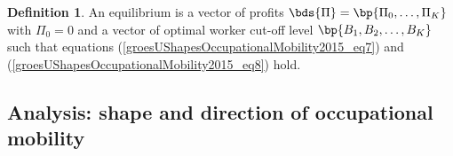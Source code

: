 \documentclass[12pt]{article}
\newcommand{\CiteReference}{../reference.bib}
\theoremstyle{definition}
\newtheorem{definition}{Definition}
\begin{document}
\begin{definition}
    An equilibrium is a vector of profits $\bds{\Pi} = \bp{\Pi_0, \ldots, \Pi_K}$ with $\Pi_0 = 0$ and a vector of optimal worker cut-off level $\bp{B_1, B_2, \ldots, B_K}$ such that equations (\ref{groesUShapesOccupationalMobility2015_eq7}) and (\ref{groesUShapesOccupationalMobility2015_eq8}) hold.
\end{definition}

\subsection{Analysis: shape and direction of occupational mobility}












 
\end{document}
